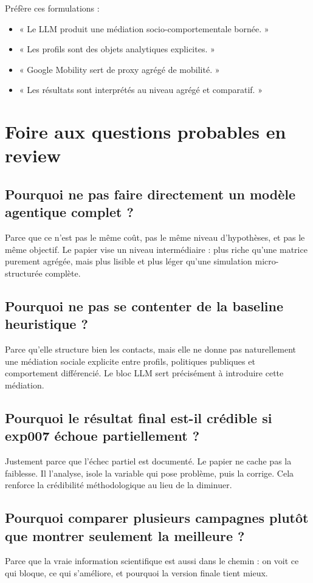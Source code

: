 \documentclass[11pt,a4paper]{article}
\begin{document}
Préfère ces formulations :
\begin{itemize}
\item « Le LLM produit une médiation socio-comportementale bornée. »
\item « Les profils sont des objets analytiques explicites. »
\item « Google Mobility sert de proxy agrégé de mobilité. »
\item « Les résultats sont interprétés au niveau agrégé et comparatif. »
\end{itemize}

\section{Foire aux questions probables en review}

\subsection*{Pourquoi ne pas faire directement un modèle agentique complet ?}
Parce que ce n'est pas le même coût, pas le même niveau d'hypothèses, et pas le même objectif. Le papier vise un niveau intermédiaire : plus riche qu'une matrice purement agrégée, mais plus lisible et plus léger qu'une simulation micro-structurée complète.

\subsection*{Pourquoi ne pas se contenter de la baseline heuristique ?}
Parce qu'elle structure bien les contacts, mais elle ne donne pas naturellement une médiation sociale explicite entre profils, politiques publiques et comportement différencié. Le bloc LLM sert précisément à introduire cette médiation.

\subsection*{Pourquoi le résultat final est-il crédible si exp007 échoue partiellement ?}
Justement parce que l'échec partiel est documenté. Le papier ne cache pas la faiblesse. Il l'analyse, isole la variable qui pose problème, puis la corrige. Cela renforce la crédibilité méthodologique au lieu de la diminuer.

\subsection*{Pourquoi comparer plusieurs campagnes plutôt que montrer seulement la meilleure ?}
Parce que la vraie information scientifique est aussi dans le chemin : on voit ce qui bloque, ce qui s'améliore, et pourquoi la version finale tient mieux.
\end{document}
